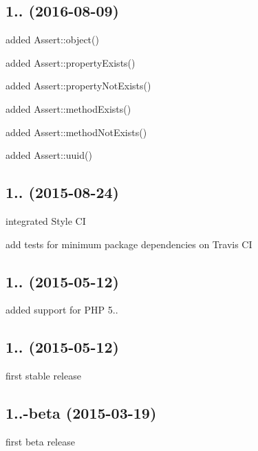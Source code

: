 \subsection*{1.. (2016-\/08-\/09)}


\begin{DoxyItemize}
\item added {\ttfamily Assert\+::object()}
\item added {\ttfamily Assert\+::property\+Exists()}
\item added {\ttfamily Assert\+::property\+Not\+Exists()}
\item added {\ttfamily Assert\+::method\+Exists()}
\item added {\ttfamily Assert\+::method\+Not\+Exists()}
\item added {\ttfamily Assert\+::uuid()}
\end{DoxyItemize}

\subsection*{1.. (2015-\/08-\/24)}


\begin{DoxyItemize}
\item integrated Style CI
\item add tests for minimum package dependencies on Travis CI
\end{DoxyItemize}

\subsection*{1.. (2015-\/05-\/12)}


\begin{DoxyItemize}
\item added support for P\+HP 5..
\end{DoxyItemize}

\subsection*{1.. (2015-\/05-\/12)}


\begin{DoxyItemize}
\item first stable release
\end{DoxyItemize}

\subsection*{1..-\/beta (2015-\/03-\/19)}


\begin{DoxyItemize}
\item first beta release 
\end{DoxyItemize}